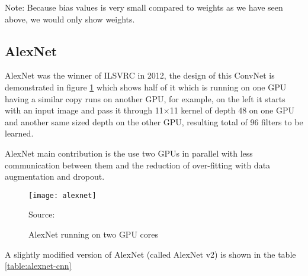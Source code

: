 Note: Because bias values is very small compared to weights as we have seen above, we would only show weights. 

\subsection{AlexNet}

AlexNet\autocite{krizhevsky2012imagenet} was the winner of ILSVRC in 2012,
the design of this ConvNet is demonstrated in figure \ref{fig:alexnet} which shows half of it which is running
on one GPU having a similar copy runs on another GPU, for example, on the left it starts with an input image
and pass it through 11×11 kernel of depth 48 on one GPU and another same sized depth on the other GPU, 
resulting total of 96 filters to be learned. 

AlexNet main contribution is the use two GPUs in parallel with less communication between them
and the reduction of over-fitting with data augmentation and dropout.

\begin{figure}[!h]
\centering
\texttt{[image: alexnet]}
\caption{AlexNet running on two GPU cores}\label{fig:alexnet}
{Source: \autocite{lecun1998gradient}\hfill}
\end{figure}

A slightly modified version of AlexNet (called AlexNet v2\autocite{krizhevsky2014one}) is shown
in the table \ref{table:alexnet-cnn}

